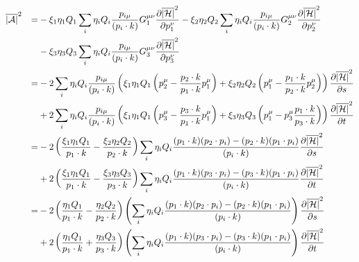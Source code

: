 \documentclass{article}
\begin{document}
\begin{alignat*}{3}
	\overline{|\mathcal{A}|}^2 &&
	= & - \xi_1\eta_1Q_1\sum_{i} \eta_i  Q_i  \frac{p_{i\mu}}{(p_i \cdot k)} G_1^{\mu\nu}\pdv{\overline{|\mathcal{H}|}^2}{p_1^\nu}
	- \xi_2\eta_2Q_2\sum_{i} \eta_i Q_i \frac{p_{i\mu}}{(p_i \cdot k)} G_2^{\mu\nu}\pdv{\overline{|\mathcal{H}|}^2}{p_2^\nu}\\&&&
	- \xi_3\eta_3Q_3\sum_{i} \eta_i Q_i \frac{p_{i\mu}}{(p_i \cdot k)} G_3^{\mu\nu}\pdv{\overline{|\mathcal{H}|}^2}{p_3^\nu}\\&&
	= & - 2\sum_{i} \eta_i Q_i \frac{p_{i\mu}}{(p_i \cdot k)}\left(\xi_1\eta_1Q_1\left(p_2^\mu - \frac{p_2 \cdot k}{p_1\cdot k}p_1^\mu\right)
	+\xi_2\eta_2Q_2 \left(p_1^\mu - \frac{p_1\cdot k}{p_2\cdot k}p_2^\mu\right)\right)\pdv{\overline{|\mathcal{H}|}^2}{s}\\&&&
	+ 2\sum_{i} \eta_i  Q_i  \frac{p_{i\mu}}{(p_i \cdot k)}\left(\xi_1\eta_1Q_1  \left(p_3^\mu - \frac{p_3 \cdot k}{p_1\cdot k}p_1^\mu\right)
	+\xi_3\eta_3Q_3 \left(p_1^\mu - p_3^\mu\frac{p_1\cdot k}{p_3\cdot k}\right)\right)\pdv{\overline{|\mathcal{H}|}^2}{t}\\&&
	= & - 2\left(\frac{\xi_1\eta_1Q_1}{p_1\cdot k}
	-\frac{\xi_2\eta_2Q_2}{p_2\cdot k} \right)\sum_{i} \eta_i Q_i \frac{(p_1\cdot k)(p_2\cdot p_i) - (p_2\cdot k)(p_1\cdot p_i)}{(p_i \cdot k)}\pdv{\overline{|\mathcal{H}|}^2}{s}\\&&&
	+ 2\left(\frac{\xi_1\eta_1Q_1}{p_1\cdot k} -\frac{\xi_3\eta_3Q_3}{p_3\cdot k}\right)\sum_{i} \eta_i  Q_i \frac{(p_1\cdot k)(p_3\cdot p_i) - (p_3\cdot k)(p_1\cdot p_i)}{(p_i \cdot k)}\pdv{\overline{|\mathcal{H}|}^2}{t}\\&&
	= & - 2\left(\frac{\eta_1Q_1}{p_1\cdot k}
	-\frac{\eta_2Q_2}{p_2\cdot k} \right)\left(\sum_{i} \eta_i Q_i \frac{(p_1\cdot k)(p_2\cdot p_i) - (p_2\cdot k)(p_1\cdot p_i)}{(p_i \cdot k)}\right)\pdv{\overline{|\mathcal{H}|}^2}{s}\\&&&
	+ 2\left(\frac{\eta_1Q_1}{p_1\cdot k} +\frac{\eta_3Q_3}{p_3\cdot k}\right)\left(\sum_{i} \eta_i  Q_i \frac{(p_1\cdot k)(p_3\cdot p_i) - (p_3\cdot k)(p_1\cdot p_i)}{(p_i \cdot k)}\right)\pdv{\overline{|\mathcal{H}|}^2}{t}
\end{alignat*}
\end{document}
